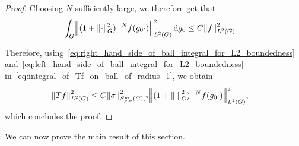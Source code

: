 \begin{proof}
    Choosing $N$ sufficiently large,
    we therefore get that
    \begin{align}
        \int_\Group &\norm [\Lebesgue 2 \Group] {(1 + \norm [\Group] \dummy^2)^{-N} f(g_0 \dummy)}^2 \dd g_0
        \leq C \norm [\Lebesgue 2 \Group] f^2
        \label{eq:right_hand_side_of_ball_integral_for_L2_boundedness}
    \end{align}

    Therefore,
    using~\eqref{eq:right_hand_side_of_ball_integral_for_L2_boundedness}
    and~\eqref{eq:left_hand_side_of_ball_integral_for_L2_boundedness}
    in~\eqref{eq:integral_of_Tf_on_ball_of_radius_1},
    we obtain
    \begin{align*}
        \norm [\Lebesgue 2 \Group] {T f}^2
        &\leq C \SymbolSemiNorm m {\rho, \sigma} ? \sigma^2
        \norm [\Lebesgue 2 \Group] {(1 + \norm [\Group] \dummy^2)^{-N} f(g_0 \dummy)}^2,
    \end{align*}
    which concludes the proof.
\end{proof}

We can now prove the main result of this section.

